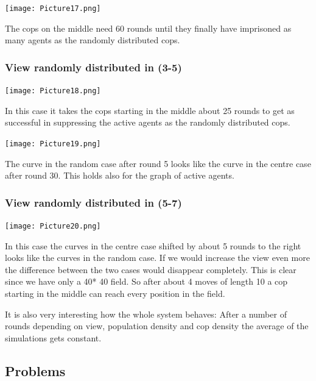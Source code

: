 \documentclass[11pt]{article}
\begin{document}
\texttt{[image: Picture17.png]}

The cops on the middle need 60 rounds until they finally have imprisoned as many agents as the randomly distributed cops.\newline\newline

\subsubsection{View randomly distributed in  (3-5)}

\texttt{[image: Picture18.png]}

In this case it takes the cops starting in the middle about 25 rounds to get as successful in suppressing the active agents as the randomly distributed cops. \newline\newline

\texttt{[image: Picture19.png]}

The curve in the random case after round 5 looks like the curve in the centre case after round 30. This holds also for the graph of active agents.\newline\newline

\subsubsection{View randomly distributed in  (5-7)}

\texttt{[image: Picture20.png]}

In this case the curves in the centre case shifted by about 5 rounds to the right looks like the curves in the random case. If we would increase the view even more the difference between the two cases would disappear completely. This is clear since we have only a 40* 40 field. So after about 4 moves of length 10 a cop starting in the middle can reach every position in the field.\newline\newline

It is also very interesting how the whole system behaves: After a number of rounds depending on view, population density and cop density  the average of the simulations gets constant.  \newline\newline

\subsection{Problems}
\end{document}
